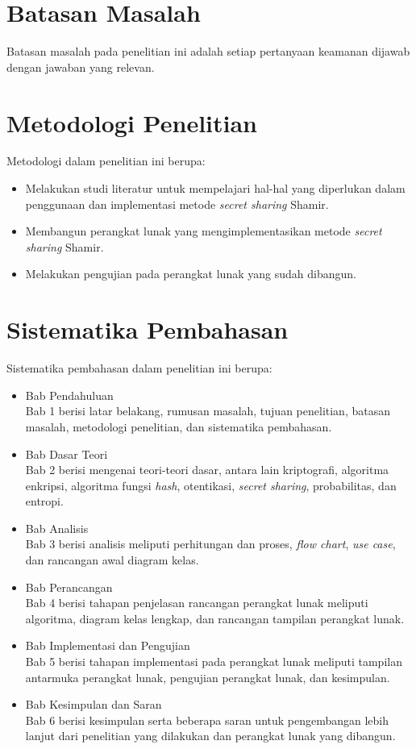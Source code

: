 \section{\textbf{Batasan Masalah}}
\label{sec:batasan masalah}

Batasan masalah pada penelitian ini adalah setiap pertanyaan keamanan dijawab dengan jawaban yang relevan.

\section{\textbf{Metodologi Penelitian}}
\label{sec:metodologi penelitian}

Metodologi dalam penelitian ini berupa:
\begin{itemize}
	\item Melakukan studi literatur untuk mempelajari hal-hal yang diperlukan dalam penggunaan dan implementasi metode \textit{secret sharing} Shamir.
	\item Membangun perangkat lunak yang mengimplementasikan metode \textit{secret sharing} Shamir.
	\item Melakukan pengujian pada perangkat lunak yang sudah dibangun.
\end{itemize}

\section{\textbf{Sistematika Pembahasan}}
\label{sec:sistematika pembahasan}

Sistematika pembahasan dalam penelitian ini berupa:
\begin{itemize}
	\item Bab Pendahuluan
	\\Bab 1 berisi latar belakang, rumusan masalah, tujuan penelitian, batasan masalah, metodologi penelitian, dan sistematika pembahasan.
	\item Bab Dasar Teori
	\\Bab 2 berisi mengenai teori-teori dasar, antara lain kriptografi, algoritma enkripsi, algoritma fungsi \textit{hash}, otentikasi, \textit{secret sharing}, probabilitas, dan entropi.
	\item Bab Analisis
	\\Bab 3 berisi analisis meliputi perhitungan dan proses, \textit{flow chart}, \textit{use case}, dan rancangan awal diagram kelas.
	\item Bab Perancangan
	\\Bab 4 berisi tahapan penjelasan rancangan perangkat lunak meliputi algoritma, diagram kelas lengkap, dan rancangan tampilan perangkat lunak.
	\item Bab Implementasi dan Pengujian
	\\Bab 5 berisi tahapan implementasi pada perangkat lunak meliputi tampilan antarmuka perangkat lunak, pengujian perangkat lunak, dan kesimpulan.
	\item Bab Kesimpulan dan Saran
	\\Bab 6 berisi kesimpulan serta beberapa saran untuk pengembangan lebih lanjut dari penelitian yang dilakukan dan perangkat lunak yang dibangun.
\end{itemize}